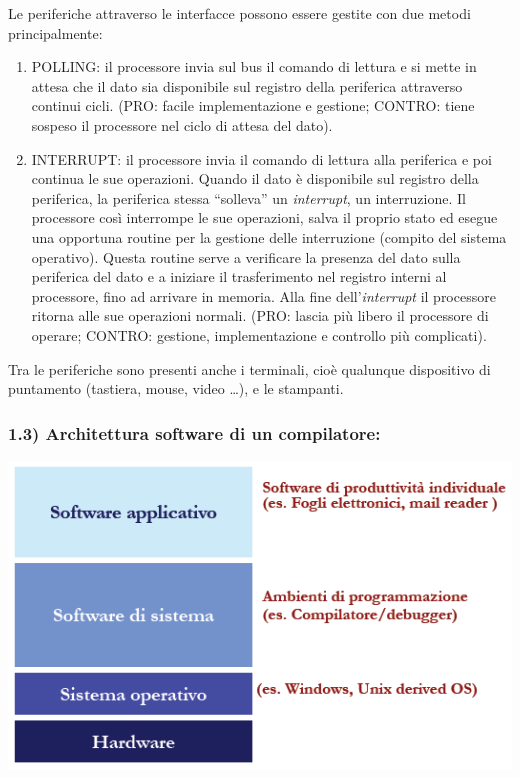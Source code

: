 \documentclass[
  paper=a4,
  oneside  ,captions=tableheading
]{scrbook}
\providecommand{\tightlist}{%
  \setlength{\itemsep}{0pt}\setlength{\parskip}{0pt}}
\begin{document}
Le periferiche attraverso le interfacce possono essere gestite con due
metodi principalmente:

\begin{enumerate}
\def\labelenumi{\arabic{enumi}.}
\tightlist
\item
  POLLING: il processore invia sul bus il comando di lettura e si mette
  in attesa che il dato sia disponibile sul registro della periferica
  attraverso continui cicli. (PRO: facile implementazione e gestione;
  CONTRO: tiene sospeso il processore nel ciclo di attesa del dato).
\item
  INTERRUPT: il processore invia il comando di lettura alla periferica e
  poi continua le sue operazioni. Quando il dato è disponibile sul
  registro della periferica, la periferica stessa ``solleva'' un
  \emph{interrupt}, un interruzione. Il processore così interrompe le
  sue operazioni, salva il proprio stato ed esegue una opportuna routine
  per la gestione delle interruzione (compito del sistema operativo).
  Questa routine serve a verificare la presenza del dato sulla
  periferica del dato e a iniziare il trasferimento nel registro interni
  al processore, fino ad arrivare in memoria. Alla fine
  dell'\emph{interrupt} il processore ritorna alle sue operazioni
  normali. (PRO: lascia più libero il processore di operare; CONTRO:
  gestione, implementazione e controllo più complicati).
\end{enumerate}

Tra le periferiche sono presenti anche i terminali, cioè qualunque
dispositivo di puntamento (tastiera, mouse, video \ldots), e le
stampanti.

\hypertarget{architettura-software-di-un-compilatore}{%
\subsubsection{1.3) Architettura software di un
compilatore:}\label{architettura-software-di-un-compilatore}}

\includegraphics{./image/image-20201112231919938.png}
\end{document}
